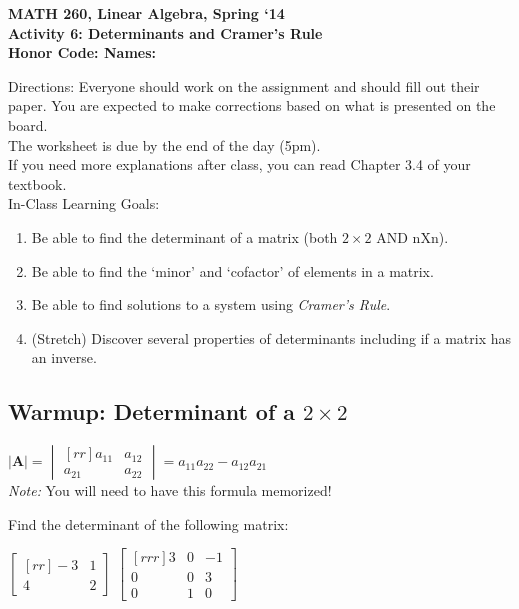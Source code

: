 \documentclass{article}
\begin{document}
\begin{flushleft}
	\bfseries{MATH 260, Linear Algebra, Spring `14}\\
	\bfseries{Activity 6:  Determinants and Cramer's Rule}\\
	\bfseries{Honor Code:} \hspace{3.5in}\bfseries{Names:}\\
\end{flushleft}
\begin{flushleft}
\vspace{.75in}
Directions:  Everyone should work on the assignment and should fill out their paper.  You are expected to make corrections based on what is presented on the board.  \\
\large The worksheet is due by the end of the day (5pm). \normalsize \\ 
If you need more explanations after class, you can read Chapter 3.4 of your textbook.\\
\vspace{0.1in}
\Large
In-Class Learning Goals:\\
\normalsize
\begin{enumerate}
\item Be able to find the determinant of a matrix (both $2\times 2$ AND nXn).
\item Be able to find the `minor' and `cofactor' of elements in a matrix. 
\item Be able to find solutions to a system using \textit{Cramer's Rule}.
\item (Stretch) Discover several properties of determinants including if a matrix has an inverse.
\end{enumerate}

\vspace{0.1in}
\begin{center}
\section*{Warmup: Determinant of a $2 \times 2$}
$|\textbf{A}| = \begin{vmatrix}[rr] a_{11} & a_{12} \\ a_{21} & a_{22} \end{vmatrix} = a_{11} a_{22} - a_{12} a_{21}$\\
\vspace{0.2in}
\textit{Note:} You will need to have this formula memorized!\\
\end{center}
Find the determinant of the following matrix:\\
\begin{center}
$\begin{bmatrix}[rr]
-3 & 1   \\
4 & 2   
\end{bmatrix}
$
\hspace{1in}
$\begin{bmatrix}[rrr]
3 & 0 & -1\\
0 & 0 &  3 \\
0 & 1 & 0
\end{bmatrix}
$
\end{center}
\vspace{2in}


\end{flushleft}
\end{document}
